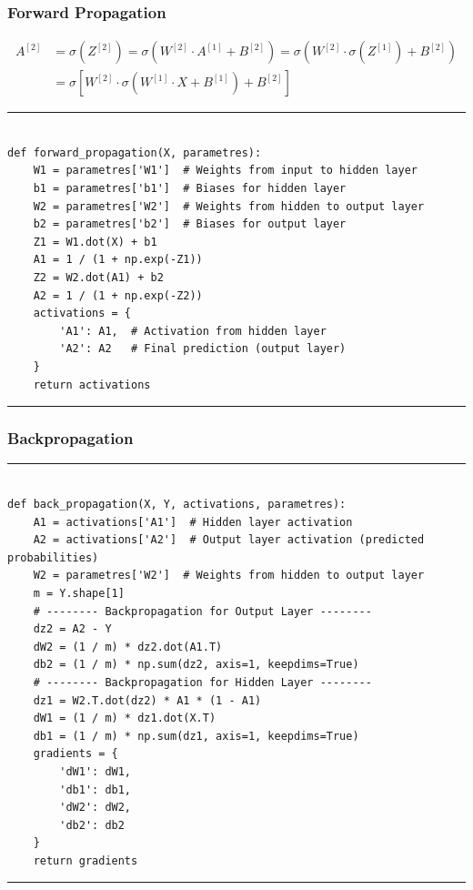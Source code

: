 \documentclass[aspectratio=169]{beamer}
\begin{document}
\begin{frame}[fragile]
\frametitle{Forward Propagation}
\scriptsize

\begin{align*}
A^{[2]} &= \sigma\left(Z^{[2]}\right) = \sigma \left( W^{[2]} \cdot A^{[1]} + B^{[2]} \right) = \sigma \left( W^{[2]} \cdot \sigma\left({Z^{[1]}}\right) + B^{[2]} \right) \\
&= \sigma \left[ W^{[2]} \cdot \sigma\left( W^{[1]} \cdot X + B^{[1]} \right) + B^{[2]} \right]
\end{align*}

\rule{\textwidth}{1pt}
\begin{verbatim}

def forward_propagation(X, parametres):
    W1 = parametres['W1']  # Weights from input to hidden layer
    b1 = parametres['b1']  # Biases for hidden layer
    W2 = parametres['W2']  # Weights from hidden to output layer
    b2 = parametres['b2']  # Biases for output layer
    Z1 = W1.dot(X) + b1
    A1 = 1 / (1 + np.exp(-Z1))
    Z2 = W2.dot(A1) + b2
    A2 = 1 / (1 + np.exp(-Z2))
    activations = {
        'A1': A1,  # Activation from hidden layer
        'A2': A2   # Final prediction (output layer)
    }
    return activations
\end{verbatim}
\rule{\textwidth}{1pt}
\end{frame}
%
%
\begin{frame}[fragile]
\frametitle{Backpropagation}
\rule{\textwidth}{1pt}
\scriptsize
\begin{verbatim}

def back_propagation(X, Y, activations, parametres):
    A1 = activations['A1']  # Hidden layer activation
    A2 = activations['A2']  # Output layer activation (predicted probabilities)
    W2 = parametres['W2']  # Weights from hidden to output layer
    m = Y.shape[1]
    # -------- Backpropagation for Output Layer --------
    dz2 = A2 - Y  
    dW2 = (1 / m) * dz2.dot(A1.T)  
    db2 = (1 / m) * np.sum(dz2, axis=1, keepdims=True)  
    # -------- Backpropagation for Hidden Layer --------
    dz1 = W2.T.dot(dz2) * A1 * (1 - A1)  
    dW1 = (1 / m) * dz1.dot(X.T)  
    db1 = (1 / m) * np.sum(dz1, axis=1, keepdims=True)  
    gradients = {
        'dW1': dW1,
        'db1': db1,
        'dW2': dW2,
        'db2': db2
    }
    return gradients
\end{verbatim}
\rule{\textwidth}{1pt}
\end{frame}
%
\end{document}
